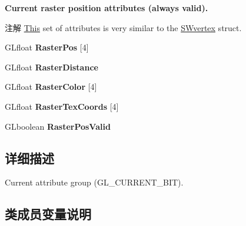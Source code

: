 \begin{Indent}\textbf{ Current raster position attributes (always valid).}\par
{\em \begin{DoxyNote}{注解}
\hyperlink{namespace_this}{This} set of attributes is very similar to the \hyperlink{struct_s_wvertex}{S\+Wvertex} struct. 
\end{DoxyNote}
}\begin{DoxyCompactItemize}
\item 
\mbox{\label{structgl__current__attrib_a90a2e909ea0a2521dfcd530b0b61b2ad}} 
G\+Lfloat {\bfseries Raster\+Pos} \mbox{[}4\mbox{]}
\item 
\mbox{\label{structgl__current__attrib_aacecbe7b99668b3d604b58cf1decb6d4}} 
G\+Lfloat {\bfseries Raster\+Distance}
\item 
\mbox{\label{structgl__current__attrib_aa3525f30bd8459cbed672147757d83bf}} 
G\+Lfloat {\bfseries Raster\+Color} \mbox{[}4\mbox{]}
\item 
\mbox{\label{structgl__current__attrib_a8e6b060052c5a10d4288705ad83d9d7a}} 
G\+Lfloat {\bfseries Raster\+Tex\+Coords} \mbox{[}4\mbox{]}
\item 
\mbox{\label{structgl__current__attrib_ae5c53a5f55588f2397371dce5c88a4a2}} 
G\+Lboolean {\bfseries Raster\+Pos\+Valid}
\end{DoxyCompactItemize}
\end{Indent}


\subsection{详细描述}
Current attribute group (G\+L\+\_\+\+C\+U\+R\+R\+E\+N\+T\+\_\+\+B\+IT). 

\subsection{类成员变量说明}
\mbox{\label{structgl__current__attrib_a17764994132bfc656323d26e4d34a7fe}} 
